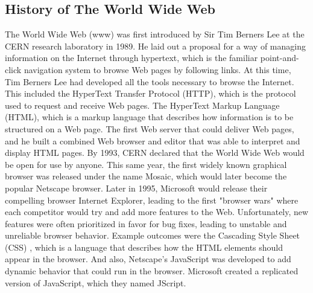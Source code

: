 \subsection{History of The World Wide Web}
The World Wide Web (www) was first introduced by Sir Tim Berners Lee at the CERN research laboratory in 1989\cite{firstweb}. He laid out a proposal for a way of managing information on the Internet through hypertext, which is the familiar point-and-click navigation system to browse Web pages by following links. At this time, Tim Berners Lee had developed all the tools necessary to browse the Internet. This included the HyperText Transfer Protocol (HTTP), which is the protocol used to request and receive Web pages. The HyperText Markup Language (HTML), which is a markup language that describes how information is to be structured on a Web page. The first Web server that could deliver Web pages, and he built a combined Web browser and editor that was able to interpret and display HTML pages. By 1993, CERN declared that the World Wide Web would be open for use by anyone\cite{historyWeb}. This same year, the first widely known graphical browser was released under the name Mosaic\cite{mosaic}, which would later become the popular Netscape browser. Later in 1995, Microsoft would release their compelling browser Internet Explorer\cite{ie}, leading to the first "browser wars" where each competitor would try and add more features to the Web. Unfortunately, new features were often prioritized in favor for bug fixes, leading to unstable and unreliable browser behavior. Example outcomes were the Cascading Style Sheet (CSS) \cite{css}, which is a language that describes how the HTML elements should appear in the browser. And also, Netscape's JavaScript \cite{jshist} was developed to add dynamic behavior that could run in the browser. Microsoft created a replicated version of JavaScript, which they named JScript\cite{jscript}.

